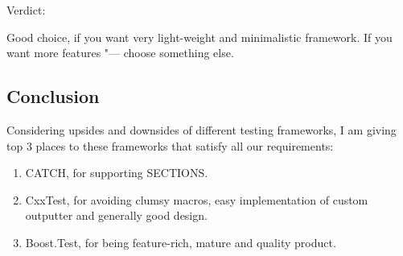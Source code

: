 \documentclass[10pt, a5paper]{article}
\begin{document}
Verdict:

Good choice, if you want very light-weight and minimalistic framework. If you want more features "--- choose something else.

\subsection*{Conclusion}

Considering upsides and downsides of different testing frameworks, I am giving top 3 places to these frameworks that satisfy all our \linebreak requirements:

\begin{enumerate}
  \item CATCH, for supporting SECTIONS.
  \item CxxTest, for avoiding clumsy macros, easy implementation of custom outputter and generally good design.
  \item Boost.Test, for being feature-rich, mature and quality product.
\end{enumerate}
\end{document}
